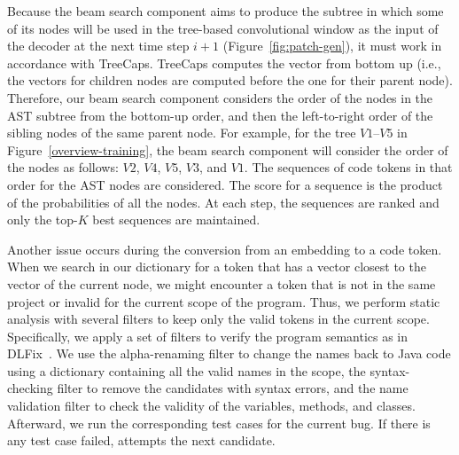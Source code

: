 Because the beam search component aims to produce the subtree
in which some of its nodes will be used in the tree-based convolutional
window as the input of the decoder at the next time step $i+1$
(Figure~\ref{fig:patch-gen}), it must work in accordance with 
TreeCaps. TreeCaps computes the vector from bottom up (i.e.,
the vectors for children nodes are computed before the one for their
parent node). Therefore, our beam search component considers the order
of the nodes in the AST subtree from the bottom-up order, and then the
left-to-right order of the sibling nodes of the same parent node. For
example, for the tree $V1$--$V5$ in Figure~\ref{overview-training},
the beam search component will consider the order of the nodes as
follows: $V2$, $V4$, $V5$, $V3$, and $V1$. The sequences of code
tokens in that order for the AST nodes are considered. The score for a
sequence is the product of the probabilities of all the nodes. At each
step, the sequences are ranked and only the top-$K$ best sequences are
maintained.

Another issue occurs during the conversion from an embedding to a code
token. When we search in our dictionary for a token that has a vector
closest to the vector of the current node, we
might encounter a token that is not in the same project or invalid for
the current scope of the program. Thus, we perform static analysis
with several filters to keep only the valid tokens in the current
scope. Specifically, we apply a set of filters to verify the program
semantics as in DLFix~\cite{icse20}. We use the alpha-renaming filter
to change the names back to Java code using a dictionary
containing all the valid names in the scope, the syntax-checking
filter to remove the candidates with syntax errors, and the name
validation filter to check the validity of the variables, methods, and
classes.
Afterward, we run the corresponding test cases for the current
bug. If there is any test case failed, {\tool} attempts the next
candidate.


